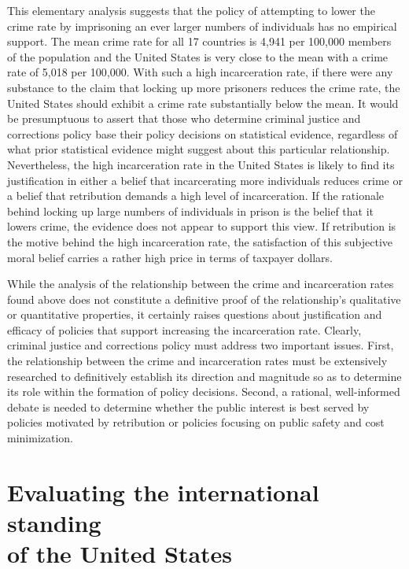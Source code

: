 This elementary analysis suggests that the policy of attempting to lower the crime rate by imprisoning an ever larger numbers of individuals has no empirical support.  The mean crime rate for all 17 countries is 4,941 per 100,000 members of the population and the United States is very close to the mean with a crime rate of 5,018 per 100,000.  With such a high incarceration rate, if there were any substance to the claim that locking up more prisoners reduces the crime rate, the United States should exhibit a crime rate substantially below the mean.  It would be presumptuous to assert that those who determine criminal justice and corrections policy base their policy decisions on statistical evidence, regardless of what prior statistical evidence might suggest about this particular relationship.  Nevertheless, the high incarceration rate in the United States is likely to find its justification in either a belief that incarcerating more individuals reduces crime or a belief that retribution demands a high level of incarceration.  If the rationale behind locking up large numbers of individuals in prison is the belief that it lowers crime, the evidence does not appear to support this view.  If retribution is the motive behind the high incarceration rate, the satisfaction of this subjective moral belief carries a rather high price in terms of taxpayer dollars.

While the analysis of the relationship between the crime and incarceration rates found above does not constitute a definitive proof of the relationship's qualitative or quantitative properties, it certainly raises questions about justification and efficacy of policies that support increasing the incarceration rate.  Clearly, criminal justice and corrections policy must address two important issues.  First, the relationship between the crime and incarceration rates must be extensively researched to definitively establish its direction and magnitude so as to determine its role within the formation of policy decisions.  Second, a rational, well-informed debate is needed to determine whether the public interest is best served by policies motivated by retribution or policies focusing on public safety and cost minimization.

\section[Evaluating the international standing of the United States]{Evaluating the international standing\\ of the United States}

